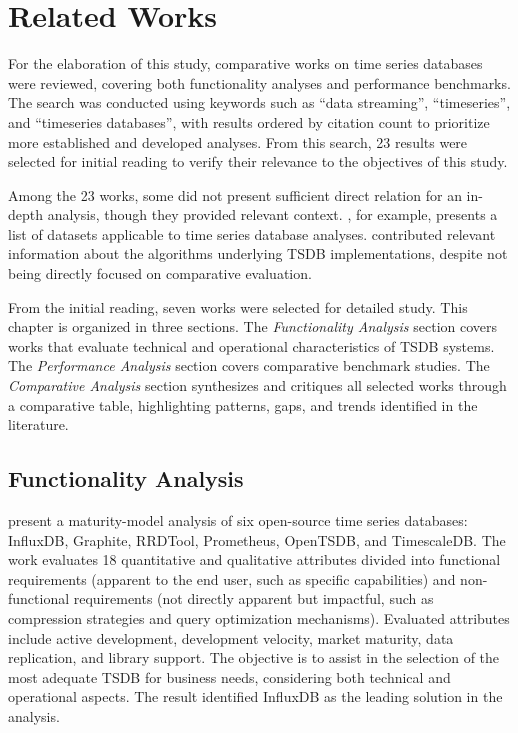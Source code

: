 \section{Related Works}
\label{sec:related}

For the elaboration of this study, comparative works on time series databases were reviewed,
covering both functionality analyses and performance benchmarks. The search was conducted
using keywords such as ``data streaming'', ``timeseries'', and ``timeseries databases'',
with results ordered by citation count to prioritize more established and developed analyses.
From this search, 23 results were selected for initial reading to verify their relevance to
the objectives of this study.

Among the 23 works, some did not present sufficient direct relation for an in-depth analysis,
though they provided relevant context. \cite{zubaroglu2021data}, for example, presents a list
of datasets applicable to time series database analyses. \cite{Gaber2005Mining} contributed
relevant information about the algorithms underlying TSDB implementations, despite not being
directly focused on comparative evaluation.

From the initial reading, seven works were selected for detailed study. This chapter is organized
in three sections. The \textit{Functionality Analysis} section covers works that evaluate
technical and operational characteristics of TSDB systems. The \textit{Performance Analysis}
section covers comparative benchmark studies. The \textit{Comparative Analysis} section
synthesizes and critiques all selected works through a comparative table, highlighting patterns,
gaps, and trends identified in the literature.

\subsection{Functionality Analysis}

\cite{Petre2019} present a maturity-model analysis of six open-source time series databases:
InfluxDB, Graphite, RRDTool, Prometheus, OpenTSDB, and TimescaleDB. The work evaluates 18
quantitative and qualitative attributes divided into functional requirements (apparent to the
end user, such as specific capabilities) and non-functional requirements (not directly
apparent but impactful, such as compression strategies and query optimization mechanisms).
Evaluated attributes include active development, development velocity, market maturity, data
replication, and library support. The objective is to assist in the selection of the most
adequate TSDB for business needs, considering both technical and operational aspects. The
result identified InfluxDB as the leading solution in the analysis.

